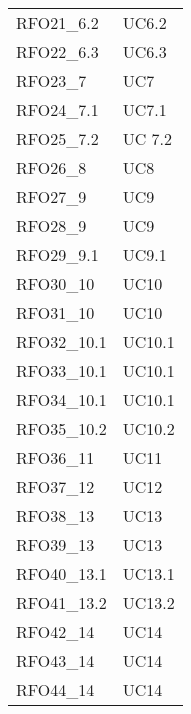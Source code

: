 \begin{longtable}{C{6cm} C{3cm}}
    RFO21\_6.2 & UC6.2 \\
    
    RFO22\_6.3 & UC6.3 \\
    
    RFO23\_7 & UC7 \\
    
    RFO24\_7.1 & UC7.1 \\
    
    RFO25\_7.2 & UC 7.2 \\
    
    RFO26\_8 & UC8 \\
    
    RFO27\_9 & UC9 \\
    
    RFO28\_9 & UC9 \\

    RFO29\_9.1 & UC9.1 \\
    
    RFO30\_10 & UC10 \\

    RFO31\_10 & UC10 \\
    
    RFO32\_10.1 & UC10.1 \\
    
    RFO33\_10.1 & UC10.1 \\
    
    RFO34\_10.1 & UC10.1 \\
    
    RFO35\_10.2 & UC10.2 \\
    
    RFO36\_11 & UC11 \\
    
    RFO37\_12 & UC12 \\
    
    RFO38\_13 & UC13 \\
    
    RFO39\_13 & UC13 \\
    
    RFO40\_13.1 & UC13.1 \\
    
    RFO41\_13.2 & UC13.2 \\
    
    RFO42\_14 & UC14 \\
    
    RFO43\_14 & UC14 \\
    
    RFO44\_14 & UC14 \\
    

\end{longtable}
